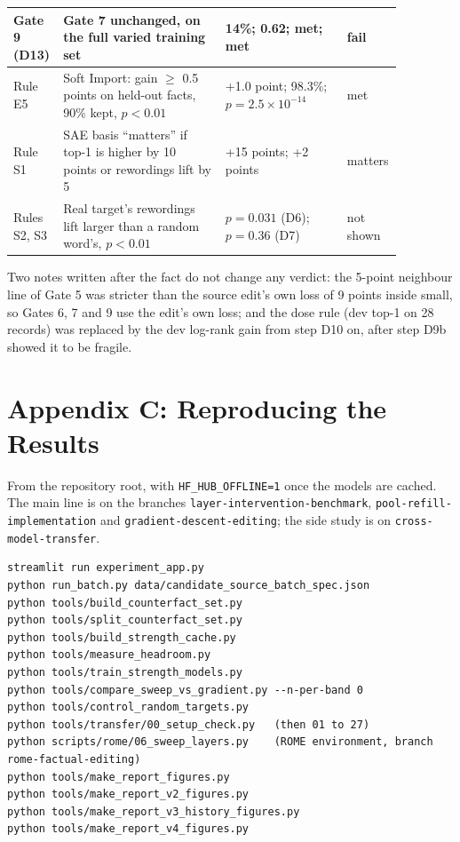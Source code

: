 {\begin{longtable}{|p{0.07\linewidth}|p{0.40\linewidth}|p{0.30\linewidth}|p{0.10\linewidth}|}
Gate 9 (D13) & Gate 7 unchanged, on the full varied training set & 14\%; 0.62; met; met & fail\\ \hline
Rule E5 & Soft Import: gain $\geq$ 0.5 points on held-out facts, 90\% kept, $p<0.01$ & +1.0 point; 98.3\%; $p=2.5\times10^{-14}$ & met\\ \hline
Rule S1 & SAE basis ``matters'' if top-1 is higher by 10 points or rewordings lift by 5 & +15 points; +2 points & matters\\ \hline
Rules S2, S3 & Real target's rewordings lift larger than a random word's, $p<0.01$ & $p=0.031$ (D6); $p=0.36$ (D7) & not shown\\ \hline
\end{longtable}
}

Two notes written after the fact do not change any verdict: the 5-point neighbour line of Gate 5 was stricter than the source edit's own loss of 9 points inside small, so Gates 6, 7 and 9 use the edit's own loss; and the dose rule (dev top-1 on 28 records) was replaced by the dev log-rank gain from step D10 on, after step D9b showed it to be fragile.

\section*{Appendix C: Reproducing the Results}

From the repository root, with \texttt{HF\_HUB\_OFFLINE=1} once the models are cached. The main line is on the branches \texttt{layer-\allowbreak intervention-\allowbreak benchmark}, \texttt{pool-\allowbreak refill-\allowbreak implementation} and \texttt{gradient-\allowbreak descent-\allowbreak editing}; the side study is on \texttt{cross-\allowbreak model-\allowbreak transfer}.

\begin{lstlisting}
streamlit run experiment_app.py
python run_batch.py data/candidate_source_batch_spec.json
python tools/build_counterfact_set.py
python tools/split_counterfact_set.py
python tools/build_strength_cache.py
python tools/measure_headroom.py
python tools/train_strength_models.py
python tools/compare_sweep_vs_gradient.py --n-per-band 0
python tools/control_random_targets.py
python tools/transfer/00_setup_check.py   (then 01 to 27)
python scripts/rome/06_sweep_layers.py    (ROME environment, branch rome-factual-editing)
python tools/make_report_figures.py
python tools/make_report_v2_figures.py
python tools/make_report_v3_history_figures.py
python tools/make_report_v4_figures.py
\end{lstlisting}


